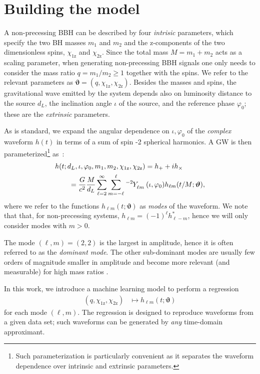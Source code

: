 \documentclass[twocolumn,showpacs,preprintnumbers,nofootinbib,prd,
superscriptaddress,10pt]{revtex4-2}
\begin{document}
\section{Building the model}
\label{sec:model}

A non-precessing BBH can be described by four {\it intrisic} parameters, which specify the two BH masses $m_1$ and $m_2$ 
and the z-components of the two dimensionless spins, $\chi_\text{1z}$ and $\chi_\text{2z}$.
Since the total mass $M = m_1 + m_2$ acts as a scaling parameter, when generating non-precessing BBH signals one  
only needs to consider the mass ratio $q = m_1/m_2 \geq 1$ together with the spins. 
We refer to the relevant parameters as $\boldsymbol{\vartheta} = (q, \chi_\text{1z}, \chi_\text{2z})$.
Besides the masses and spins, the gravitational wave emitted by the system depends also on 
luminosity distance to the source $d_L$, the inclination angle $\iota$ of the source, and the reference phase 
$\varphi_0$; these are the {\it extrinsic} parameters.

As is standard, we expand the angular dependence on $\iota, \varphi_0$ of the {\it complex} waveform $h(t)$ 
in terms of a sum of spin -2 spherical harmonics.
A GW is then parameterized\footnote{Such parameterization is particularly convenient as it separates 
the waveform dependence over intrinsic and extrinsic parameters.} as~\cite{Estelles:2021gvs}:
\begin{align} \label{eq:h_parametrization}
	&h(t; d_L,\iota,\varphi_0, m_1, m_2, \chi_\text{1z}, \chi_\text{2z}) = h_+ + i h_\times \nonumber \\
		&\qquad= \frac{G}{c^2} \frac{M}{d_L}\sum_{\ell = 2}^{\infty} \sum_{m = -\ell}^{\ell} \tensor[^{-2}]{Y}{_{\ell m}}(\iota, \varphi_0) h_{\ell m}(t/M; \boldsymbol{\vartheta}),
\end{align}
where we refer to the functions $h_{\ell m}(t; \boldsymbol{\vartheta})$ as {\it modes} of the waveform. We note that that, 
for non-precessing systems, $h_{\ell m} = (-1)^\ell h^*_{\ell -m}$, hence we will only consider modes with $m>0$.

The mode $(\ell, m) = (2,2)$ is the largest in amplitude, hence it is often referred to as the {\it dominant mode}. 
The other sub-dominant modes are usually few orders of magnitude smaller in amplitude and become more relevant 
(and measurable) for high mass ratios \cite{Mills:2020thr, LIGOScientific:2020stg, LIGOScientific:2020zkf}.

In this work, we introduce a machine learning model to perform a regression
\begin{align}\label{eq:objective}
	(q, \chi_\text{1z}, \chi_\text{2z}) &\longmapsto h_{\ell m}(t; \boldsymbol{\vartheta})
\end{align}
for each mode $(\ell,m)$.
The regression is designed to reproduce waveforms from a given data set; such waveforms can be generated 
by {\it any} time-domain approximant.
\end{document}
